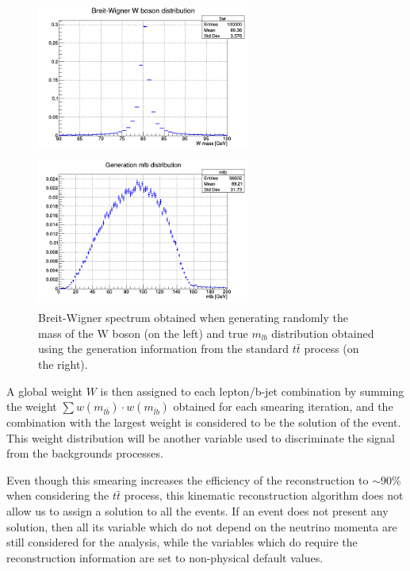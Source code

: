 \documentclass[a4paper, 10pt, openright]{report}
\begin{document}
\begin{figure}[htbp]
\centering
\begin{minipage}[b]{.48\textwidth}
\includegraphics[width=7cm, height=5cm]{figs/bw.png}
\end{minipage}\hfill
\begin{minipage}[b]{.48\textwidth}
\includegraphics[width=7cm, height=5cm]{figs/mlb.png}
\end{minipage} \hfill
\caption{Breit-Wigner spectrum obtained when generating randomly the mass of the W boson (on the left) and true $m_{lb}$ distribution obtained using the generation information from the standard $t \bar t$ process (on the right).}
\label{fig:truemlb}
\end{figure}

A global weight $W$ is then assigned to each lepton/b-jet combination by summing the weight $\sum w(m_{l \bar b}) \cdot w(m_{\bar l b})$ obtained for each smearing iteration, and the combination with the largest weight is considered to be the solution of the event. This weight distribution will be another variable used to discriminate the signal from the backgrounds processes. 

Even though this smearing increases the efficiency of the reconstruction to $\sim 90$\% when considering the $t \bar t$ process, this kinematic reconstruction algorithm does not allow us to assign a solution to all the events. If an event does not present any solution, then all its variable which do not depend on the neutrino momenta are still considered for the analysis, while the variables which do require the reconstruction information are set to non-physical default values.
\end{document}
